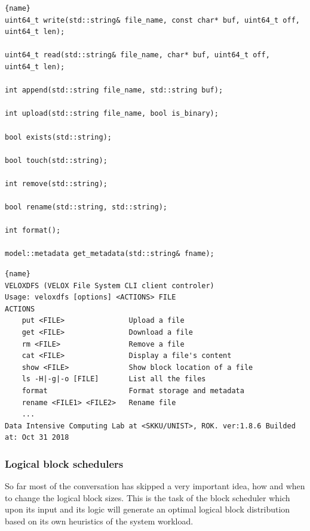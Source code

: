 \begin{lstlisting}[caption=extracted from DFS.h, label={lst:API}, frame=tb]{name}
uint64_t write(std::string& file_name, const char* buf, uint64_t off, uint64_t len);
 
uint64_t read(std::string& file_name, char* buf, uint64_t off, uint64_t len);

int append(std::string file_name, std::string buf);

int upload(std::string file_name, bool is_binary);

bool exists(std::string);

bool touch(std::string);

int remove(std::string);

bool rename(std::string, std::string);

int format();

model::metadata get_metadata(std::string& fname);
\end{lstlisting}

\begin{lstlisting}[caption=extracted from veloxdfs --help, label={lst:cli}, frame=tb]{name}
VELOXDFS (VELOX File System CLI client controler)
Usage: veloxdfs [options] <ACTIONS> FILE
ACTIONS
    put <FILE>               Upload a file
    get <FILE>               Download a file
    rm <FILE>                Remove a file
    cat <FILE>               Display a file's content
    show <FILE>              Show block location of a file
    ls -H|-g|-o [FILE]       List all the files
    format                   Format storage and metadata
    rename <FILE1> <FILE2>   Rename file 
    ...
Data Intensive Computing Lab at <SKKU/UNIST>, ROK. ver:1.8.6 Builded at: Oct 31 2018
\end{lstlisting}

\subsubsection{Logical block schedulers}

So far most of the conversation has skipped a very important idea, how and when
to change the logical block sizes. This is the task of the block scheduler
which upon its input and its logic will generate an optimal logical block
distribution based on its own heuristics of the system workload.


